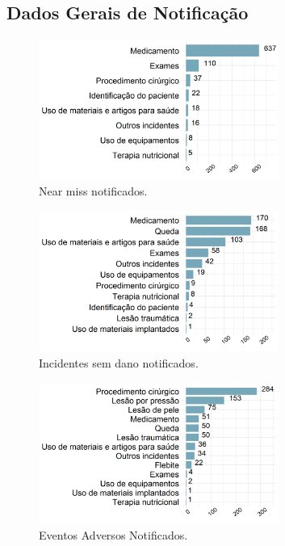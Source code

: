 \documentclass[
  a4paper]{article}
\begin{document}
\subsection{Dados Gerais de Notificação}

\begin{figure}[H]
\caption{Near miss notificados.}
\includegraphics[width=0.7\textwidth]{Imagens/barra_erro.png}
\end{figure}

\begin{figure}[H]
\caption{Incidentes sem dano notificados.}
\includegraphics[width=0.7\textwidth]{Imagens/barra_incidente.png}
\end{figure}

\begin{figure}[H]
\caption{Eventos Adversos Notificados.}
\includegraphics[width=0.7\textwidth]{Imagens/barra_evento.png}
\end{figure}
\end{document}
